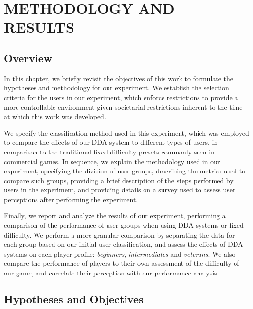 \chapter{METHODOLOGY AND RESULTS}
\label{ch:methodology-results}

\section{Overview}

In this chapter, we briefly revisit the objectives of this work to formulate the hypotheses and methodology for our experiment. We establish the selection criteria for the users in our experiment, which enforce restrictions to provide a more controllable environment given societarial restrictions inherent to the time at which this work was developed.

We specify the classification method used in this experiment, which was employed to compare the effects of our DDA system to different types of users, in comparison to the traditional fixed difficulty presets commonly seen in commercial games. In sequence, we explain the methodology used in our experiment, specifying the division of user groups, describing the metrics used to compare such groups, providing a brief description of the steps performed by users in the experiment, and providing details on a survey used to assess user perceptions after performing the experiment.

Finally, we report and analyze the results of our experiment, performing a comparison of the performance of user groups when using DDA systems or fixed difficulty. We perform a more granular comparison by separating  the data for each group based on our initial user classification, and assess the effects of DDA systems on each player profile: \emph{beginners}, \emph{intermediates} and \emph{veterans}. We also compare the performance of players to their own assessment of the difficulty of our game, and correlate their perception with our performance analysis.


\section{Hypotheses and Objectives}
\label{sec:hypotheses-and-objectives}

